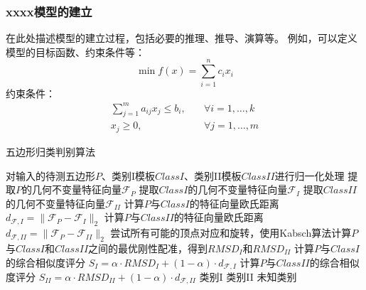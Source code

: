 \subsubsection{xxxx模型的建立}

在此处描述模型的建立过程，包括必要的推理、推导、演算等。
例如，可以定义模型的目标函数、约束条件等：
\begin{equation}
    \min f(x) = \sum_{i=1}^{n} c_i x_i \label{eq:obj_func_q1}
\end{equation}
约束条件：
\begin{align}
    \sum_{j=1}^{m} a_{ij} x_j \leq b_i, \quad & \forall i = 1, \dots, k \\
    x_j \geq 0, \quad & \forall j = 1, \dots, m
\end{align}

\begin{algorithm}[H] %
\caption{五边形归类判别算法}
\label{alg:polygon_classification}
\begin{algorithmic}[1] %
        \State 对输入的待测五边形$P$、类别I模板$\mathit{ClassI}$、类别II模板$\mathit{ClassII}$进行归一化处理
        \State 提取$P$的几何不变量特征向量$\mathcal{F}_P$
        \State 提取$\mathit{ClassI}$的几何不变量特征向量$\mathcal{F}_I$
        \State 提取$\mathit{ClassII}$的几何不变量特征向量$\mathcal{F}_{II}$
        \State 计算$P$与$\mathit{ClassI}$的特征向量欧氏距离 $d_{\mathcal{F},I} = \|\mathcal{F}_P - \mathcal{F}_I\|_2$
        \State 计算$P$与$\mathit{ClassII}$的特征向量欧氏距离 $d_{\mathcal{F},II} = \|\mathcal{F}_P - \mathcal{F}_{II}\|_2$
        \State 尝试所有可能的顶点对应和旋转，使用Kabsch算法计算$P$与$\mathit{ClassI}$和$\mathit{ClassII}$之间的最优刚性配准，得到$\mathit{RMSD}_{I}$和$\mathit{RMSD}_{II}$
        \State 计算$P$与$\mathit{ClassI}$的综合相似度评分 $S_I = \alpha \cdot \mathit{RMSD}_I + (1-\alpha) \cdot d_{\mathcal{F},I}$ 
        \State 计算$P$与$\mathit{ClassII}$的综合相似度评分 $S_{II} = \alpha \cdot \mathit{RMSD}_{II} + (1-\alpha) \cdot d_{\mathcal{F},II}$
         
            \State \Return 类别I
            \State \Return 类别II
        \Else
            \State \Return 未知类别
        \EndIf
    \EndFunction
\end{algorithmic}
\end{algorithm}


